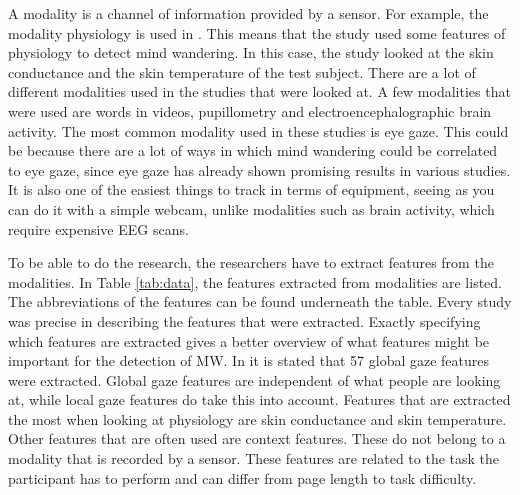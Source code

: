 A modality is a channel of information provided by a sensor. For example, the modality physiology is used in \cite{Blanchard2014AutomatedLearning}. This means that the study used some features of physiology to detect mind wandering. In this case, the study looked at the skin conductance and the skin temperature of the test subject. There are a lot of different modalities used in the studies that were looked at. A few modalities that were used are words in videos, pupillometry and electroencephalographic brain activity. The most common modality used in these studies is eye gaze. This could be because there are a lot of ways in which mind wandering could be correlated to eye gaze, since eye gaze has already shown promising results in various studies. It is also one of the easiest things to track in terms of equipment, seeing as you can do it with a simple webcam, unlike modalities such as brain activity, which require expensive EEG scans.

To be able to do the research, the researchers have to extract features from the modalities. In Table \ref{tab:data}, the features extracted from modalities are listed. The abbreviations of the features can be found underneath the table. Every study was precise in describing the features that were extracted. Exactly specifying which features are extracted gives a better overview of what features might be important for the detection of MW. In \cite{Hutt2017OutClassroom} it is stated that 57 global gaze features were extracted. Global gaze features are independent of what people are looking at, while local gaze features do take this into account. Features that are extracted the most when looking at physiology are skin conductance and skin temperature. Other features that are often used are context features. These do not belong to a modality that is recorded by a sensor. These features are related to the task the participant has to perform and can differ from page length to task difficulty.